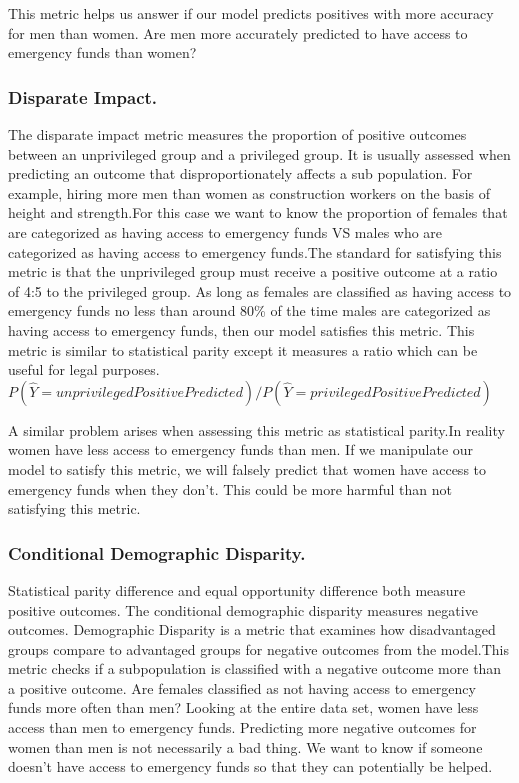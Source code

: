 \documentclass[water,article,submit,moreauthors,pdftex]{mdpi}
\begin{document}
This metric helps us answer if our model predicts positives with more
accuracy for men than women. Are men more accurately predicted to have
access to emergency funds than women?

\hypertarget{disparate-impact.}{%
\subsubsection{Disparate Impact.}\label{disparate-impact.}}

The disparate impact metric measures the proportion of positive outcomes
between an unprivileged group and a privileged group. It is usually
assessed when predicting an outcome that disproportionately affects a
sub population. For example, hiring more men than women as construction
workers on the basis of height and strength.For this case we want to
know the proportion of females that are categorized as having access to
emergency funds VS males who are categorized as having access to
emergency funds.The standard for satisfying this metric is that the
unprivileged group must receive a positive outcome at a ratio of 4:5 to
the privileged group. As long as females are classified as having access
to emergency funds no less than around 80\% of the time males are
categorized as having access to emergency funds, then our model
satisfies this metric.\citep{caton2020fairness} This metric is similar
to statistical parity except it measures a ratio which can be useful for
legal purposes.
\(P(\hat{Y}=unprivilegedPositivePredicted) /P(\hat{Y}=privilegedPositivePredicted)\)

A similar problem arises when assessing this metric as statistical
parity.In reality women have less access to emergency funds than men. If
we manipulate our model to satisfy this metric, we will falsely predict
that women have access to emergency funds when they don't. This could be
more harmful than not satisfying this metric.

\hypertarget{conditional-demographic-disparity.}{%
\subsubsection{Conditional Demographic
Disparity.}\label{conditional-demographic-disparity.}}

Statistical parity difference and equal opportunity difference both
measure positive outcomes. The conditional demographic disparity
measures negative outcomes. Demographic Disparity is a metric that
examines how disadvantaged groups compare to advantaged groups for
negative outcomes from the model.This metric checks if a subpopulation
is classified with a negative outcome more than a positive outcome. Are
females classified as not having access to emergency funds more often
than men? Looking at the entire data set, women have less access than
men to emergency funds. Predicting more negative outcomes for women than
men is not necessarily a bad thing. We want to know if someone doesn't
have access to emergency funds so that they can potentially be helped.
\end{document}
